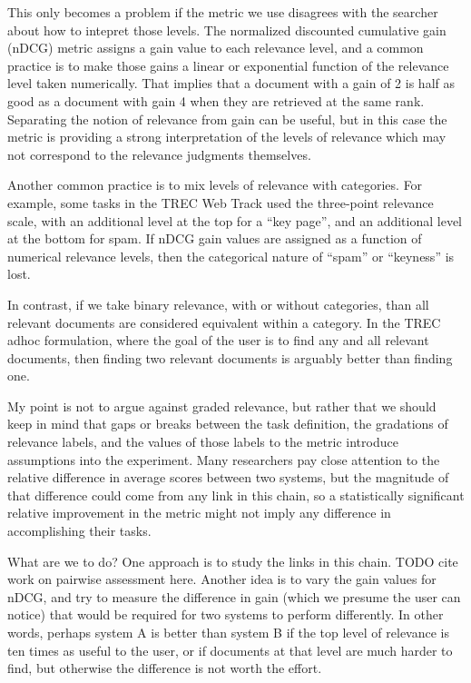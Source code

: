 \documentclass[nobib]{tufte-book}
\begin{document}
This only becomes a problem if the metric we use disagrees with the searcher about how to intepret those levels.  The normalized discounted cumulative gain (nDCG) metric\autocite{jarvelin_cumulated_2002} assigns a gain value to each relevance level, and a common practice is to make those gains a linear or exponential function of the relevance level taken numerically.  That implies that a document with a gain of 2 is half as good as a document with gain 4 when they are retrieved at the same rank.  Separating the notion of relevance from gain can be useful, but in this case the metric is providing a strong interpretation of the levels of relevance which may not correspond to the relevance judgments themselves.

Another common practice is to mix levels of relevance with categories. For example, some tasks in the TREC Web Track used the three-point relevance scale, with an additional level at the top for a ``key page'', and an additional level at the bottom for spam.  If nDCG gain values are assigned as a function of numerical relevance levels, then the categorical nature of ``spam'' or ``keyness'' is lost. 

In contrast, if we take binary relevance, with or without categories, than all relevant documents are considered equivalent within a category.  In the TREC adhoc formulation, where the goal of the user is to find any and all relevant documents, then finding two relevant documents is arguably better than finding one.

My point is not to argue against graded relevance, but rather that we should keep in mind that gaps or breaks between the task definition, the gradations of relevance labels, and the values of those labels to the metric introduce assumptions into the experiment.  Many researchers pay close attention to the relative difference in average scores between two systems, but the magnitude of that difference could come from any link in this chain, so a statistically significant relative improvement in the metric might not imply any difference in accomplishing their tasks.

What are we to do?  One approach is to study the links in this chain.  TODO cite work on pairwise assessment here.  Another idea is to vary the gain values for nDCG, and try to measure the difference in gain (which we presume the user can notice) that would be required for two systems to perform differently.  In other words, perhaps system A is better than system B if the top level of relevance is ten times as useful to the user, or if documents at that level are much harder to find, but otherwise the difference is not worth the effort.
\end{document}

